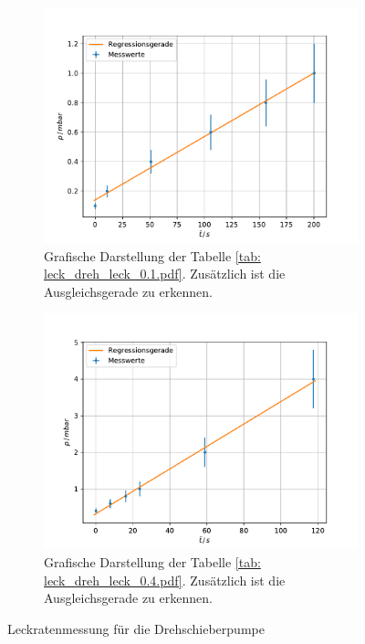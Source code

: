 \begin{figure}
    \centering
    \begin{subfigure}{0.4\textwidth}
        \centering
        \includegraphics[width=1\textwidth]{../Messdaten/plots/dreh/leckrate_dreh_01.pdf}
        \caption{Grafische Darstellung der Tabelle \ref{tab: leck_dreh_leck_0.1.pdf}. Zusätzlich ist die Ausgleichsgerade zu erkennen.}
        \label{fig: drehs_leck_1}
    \end{subfigure}
    \begin{subfigure}{0.4\textwidth}
        \centering
        \includegraphics[width=1\textwidth]{../Messdaten/plots/dreh/leckrate_dreh_04.pdf}
        \caption{Grafische Darstellung der Tabelle \ref{tab: leck_dreh_leck_0.4.pdf}. Zusätzlich ist die Ausgleichsgerade zu erkennen.}
    \end{subfigure}
    \caption{Leckratenmessung für die Drehschieberpumpe}
      \label{fig: leck_dreh_1}
\end{figure}

